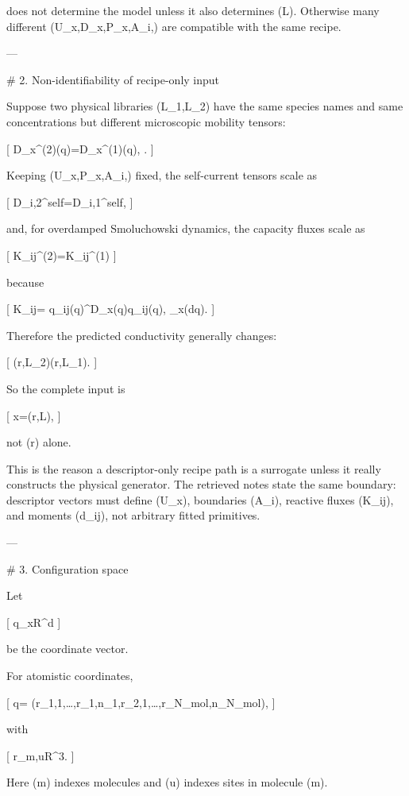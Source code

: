 does not determine the model unless it also determines (\mathcal L). Otherwise many different (U_x,D_x,P_x,A_i,\Psi) are compatible with the same recipe.

---

# 2. Non-identifiability of recipe-only input

Suppose two physical libraries (\mathcal L_1,\mathcal L_2) have the same species names and same concentrations but different microscopic mobility tensors:

[
D_x^{(2)}(q)=\alpha D_x^{(1)}(q),
\qquad
\alpha{}.
]

Keeping (U_x,P_x,A_i,\Psi) fixed, the self-current tensors scale as

[
D_{i,2}^{\rm self}=\alpha D_{i,1}^{\rm self},
]

and, for overdamped Smoluchowski dynamics, the capacity fluxes scale as

[
K_{ij}^{(2)}=\alpha K_{ij}^{(1)}
]

because

[
K_{ij}=
\int
\nabla q_{ij}(q)^\top D_x(q)\nabla q_{ij}(q),
\rho_x(\mathrm dq).
]

Therefore the predicted conductivity generally changes:

[
\sigma(r,\mathcal L_2)\neq \sigma(r,\mathcal L_1).
]

So the complete input is

[
x=(r,\mathcal L),
]

not (r) alone.

This is the reason a descriptor-only recipe path is a surrogate unless it really constructs the physical generator. The retrieved notes state the same boundary: descriptor vectors must define (U_x), boundaries (A_i), reactive fluxes (K_{ij}), and moments (d_{ij}), not arbitrary fitted primitives. 

---

# 3. Configuration space

Let

[
q\in \Omega_x\subseteq \mathbb R^d
]

be the coordinate vector.

For atomistic coordinates,

[
q=
(r_{1,1},\ldots,r_{1,n_1},r_{2,1},\ldots,r_{N_{\rm mol},n_{N_{\rm mol}}}),
]

with

[
r_{m,u}\in\mathbb R^3.
]

Here (m) indexes molecules and (u) indexes sites in molecule (m).

